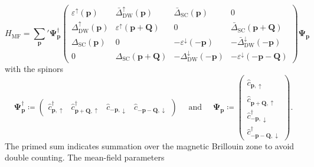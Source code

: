 \documentclass{article}
\begin{document}
\begin{equation}
  H_\mathrm{MF} = \sum_{\mathbf{p}}' \mathbf{\Psi}_{\mathbf{p}}^\dagger
  \begin{pmatrix}
    \varepsilon^\uparrow (\mathbf{p}) & \bar{\Delta}_\mathrm{DW}^{\uparrow} (\mathbf{p}) & \bar{\Delta}_\mathrm{SC} (\mathbf{p}) & 0 \\
    \Delta_\mathrm{DW}^{\uparrow} (\mathbf{p}) & \varepsilon^\uparrow (\mathbf{p} + \mathbf{Q}) & 0 & \bar{\Delta}_\mathrm{SC} (\mathbf{p} + \mathbf{Q}) \\
    \Delta_\mathrm{SC} (\mathbf{p}) & 0 & - \varepsilon^\downarrow (- \mathbf{p}) & -\bar{\Delta}_\mathrm{DW}^{\downarrow} (-\mathbf{p}) \\
    0 & \Delta_\mathrm{SC} (\mathbf{p} + \mathbf{Q}) & -\Delta_\mathrm{DW}^{\downarrow} (-\mathbf{p}) & - \varepsilon^\downarrow (- \mathbf{p} - \mathbf{Q})
  \end{pmatrix}
  \mathbf{\Psi}_{\mathbf{p}}
\end{equation}
with the spinors
\begin{equation}
  \mathbf{\Psi}_{\mathbf{p}}^\dagger \coloneqq \begin{pmatrix}
    \hat{c}_{ \mathbf{p}, \uparrow }^\dagger & \hat{c}_{ \mathbf{p} + \mathbf{Q}, \uparrow }^\dagger & \hat{c}_{ -\mathbf{p}, \downarrow }^{\phantom{\dagger}} & \hat{c}_{ -\mathbf{p} - \mathbf{Q}, \downarrow }^{\phantom{\dagger}}
  \end{pmatrix}
  \quad\text{ and }\quad 
  \mathbf{\Psi}_{\mathbf{p}} \coloneqq \begin{pmatrix}
    \hat{c}_{ \mathbf{p}, \uparrow }^{\phantom{\dagger}} \\ \hat{c}_{ \mathbf{p} + \mathbf{Q}, \uparrow }^{\phantom{\dagger}} \\ \hat{c}_{ -\mathbf{p}, \downarrow }^{\dagger} \\ \hat{c}_{ -\mathbf{p} - \mathbf{Q}, \downarrow }^{\dagger}
  \end{pmatrix}.
\end{equation}
The primed sum indicates summation over the magnetic Brillouin zone to avoid double counting.
The mean-field parameters
\end{document}
